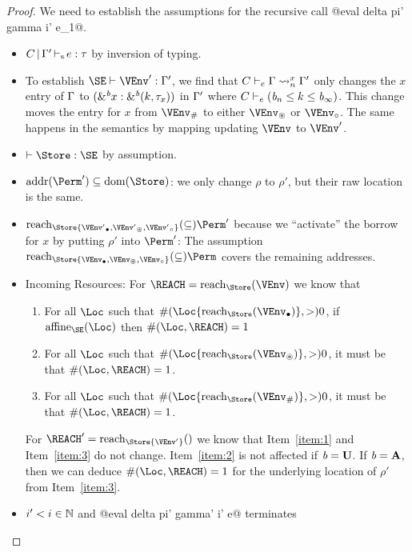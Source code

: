 \begin{proof}
  We need to establish the assumptions for the recursive call
  @eval delta pi' gamma i' e_1@.
  \begin{itemize}
  \item $\inferS{C}{\E'}{e}{\tau}$ by inversion of typing.
  \item To establish $\SE \vdash \VEnv' : \E'$, we find that
    $\lregion{C}{x}{\E}{\E'}$ only changes the $x$ entry of $\E$ to
    ${\bvar{\borrow[\BORROW]{x}}{\borrowty[\BORROW] k{\tau_x}}}$ in
    $\E'$ where $C \vdash_e {(\BORROW_n\lk k\lk\BORROW_\infty)}$. This
    change moves the entry for $x$ from $\Suspended\VEnv$ to either
    $\MutableBorrows\VEnv$ or $\ImmutableBorrows\VEnv$. The same
    happens in the semantics by mapping updating $\VEnv$ to $\VEnv'$. 
  \item $\vdash \Store : \SE$ by assumption.
  \item $\Addresses{\Perm'} \subseteq \Dom\Store$: we only change
    $\rho$ to $\rho'$, but their raw location is the same.
  \item $\Reach\Store{\Active{\VEnv'}, \MutableBorrows{\VEnv'},
      \ImmutableBorrows{\VEnv'}} \subseteq \Perm'$ because we
    ``activate'' the borrow for $x$ by putting $\rho'$ into $\Perm'$:
    The assumption $\Reach\Store{\Active\VEnv, \MutableBorrows\VEnv,
      \ImmutableBorrows\VEnv} \subseteq \Perm$ covers the remaining addresses.
  \item Incoming Resources: For $\REACH = \Reach\Store\VEnv$ we know that
    \begin{enumerate}
    \item\label{item:1} 
      For all $\Loc$ such that $\MultiNumber\Loc{\Reach{\Store}{\Active\VEnv}} >0$,
      if $\Affine{\SE}\Loc$ then $\MultiNumber\Loc\REACH= 1$
    \item\label{item:2} For all $\Loc$ such that $
      \MultiNumber\Loc{\Reach{\Store}{\MutableBorrows\VEnv}} >0$, it
      must be that $\MultiNumber\Loc\REACH=1$.
    \item\label{item:3} For all $\Loc$ such that $
      \MultiNumber\Loc{\Reach{\Store}{\Suspended\VEnv}} >0$, it
      must be that $\MultiNumber\Loc\REACH=1$.
    \end{enumerate}
    For $\REACH' = \Reach\Store{\VEnv'}$ we know that
    Item~\ref{item:1} and Item~\ref{item:3} do not change. Item~\ref{item:2} is not
    affected if $\BORROW=\IBORROW$. If $\BORROW=\MBORROW$, then we
    can deduce $\MultiNumber\Loc\REACH=1$ for the
    underlying location of $\rho'$ from Item~\ref{item:3}. 
  \item  $i'<i\in\Nat$ and @eval delta pi' gamma' i' e@ terminates

\end{itemize}
\end{proof}
